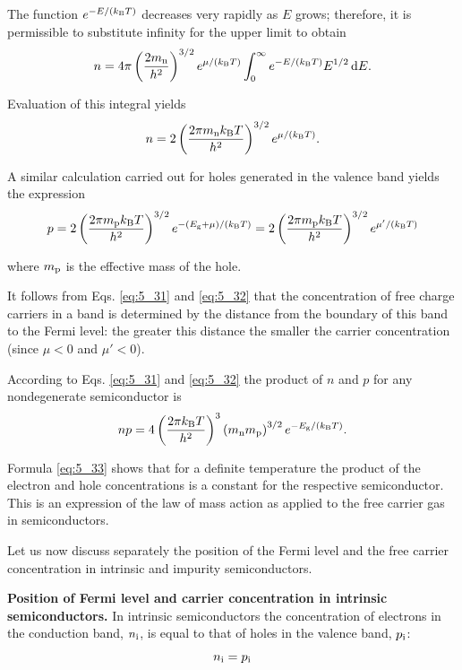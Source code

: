 \noindent
The function $e^{-E/(k_{\text{B}}T)}$ decreases very rapidly as $E$ grows; therefore, it is permissible to substitute infinity for the upper limit to obtain
\begin{equation*}
    n = 4\pi \left(\frac{2m_{\text{n}}}{h^2}\right)^{3/2} e^{\mu/(k_{\text{B}}T)} \int_0^{\infty} e^{-E/(k_{\text{B}}T)} E^{1/2}\, \mathrm{d} E.
\end{equation*}

\noindent
Evaluation of this integral yields
\begin{equation}\label{eq:5_31}
    n = 2 \left(\frac{2 \pi m_{\text{n}} k_{\text{B}}T}{h^2}\right)^{3/2} e^{\mu/(k_{\text{B}}T)}.
\end{equation}

\noindent
A similar calculation carried out for holes generated in the valence band yields the expression
\begin{equation}\label{eq:5_32}
    p = 2 \left(\frac{2 \pi m_{\text{p}} k_{\text{B}}T}{h^2}\right)^{3/2} e^{-(E_{\text{g}}+\mu)/(k_{\text{B}}T)} = 2 \left(\frac{2 \pi m_{\text{p}} k_{\text{B}}T}{h^2}\right)^{3/2} e^{\mu'/(k_{\text{B}}T)}
\end{equation}

\noindent
where $m_{\text{p}}$ is the effective mass of the hole.

It follows from Eqs. \eqref{eq:5_31} and \eqref{eq:5_32} that the concentration of free charge carriers in a band is determined by the distance from the boundary of this band to the Fermi level: the greater this distance the smaller the carrier concentration (since $\mu<0$ and $\mu'<0$).

According to Eqs. \eqref{eq:5_31} and \eqref{eq:5_32} the product of $n$ and $p$ for any nondegenerate semiconductor is
\begin{equation}\label{eq:5_33}
    np = 4 \left(\frac{2 \pi k_{\text{B}}T}{h^2}\right)^3 \left(m_{\text{n}}m_{\text{p}}\right)^{3/2} e^{-E_{\text{g}}/(k_{\text{B}}T)}.
\end{equation}

Formula \eqref{eq:5_33} shows that for a definite temperature the product of the electron and hole concentrations is a constant for the respective semiconductor. This is an expression of the law of mass action as applied to the free carrier gas in semiconductors.

Let us now discuss separately the position of the Fermi level and the free carrier concentration in intrinsic and impurity semiconductors.

\textbf{Position of Fermi level and carrier concentration in intrinsic semiconductors.} In intrinsic semiconductors the concentration of electrons in the conduction band, $n_{\text{i}}$, is equal to that of holes in the valence band, $p_{\text{i}}$:
\begin{equation}\label{eq:5_34}
    n_{\text{i}} = p_{\text{i}}
\end{equation}

